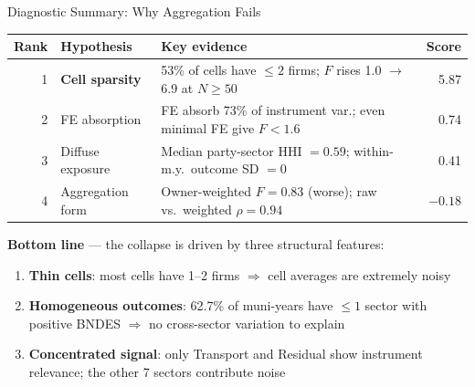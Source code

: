 \documentclass[aspectratio=169,11pt]{beamer}
\begin{document}
\begin{frame}[shrink=5]{Diagnostic Summary: Why Aggregation Fails}

\begin{center}
\small
\begin{tabular}{r l p{6cm} r}
\toprule
\textbf{Rank} & \textbf{Hypothesis} & \textbf{Key evidence} & \textbf{Score} \\
\midrule
1 & \textbf{Cell sparsity} & 53\% of cells have $\leq 2$ firms; $F$ rises 1.0 $\to$ 6.9 at $N \geq 50$ & 5.87 \\[3pt]
2 & FE absorption & FE absorb 73\% of instrument var.; even minimal FE give $F < 1.6$ & 0.74 \\[3pt]
3 & Diffuse exposure & Median party-sector HHI $= 0.59$; within-m.y.\ outcome SD $= 0$ & 0.41 \\[3pt]
4 & Aggregation form & Owner-weighted $F = 0.83$ (worse); raw vs.\ weighted $\rho = 0.94$ & $-0.18$ \\
\bottomrule
\end{tabular}
\end{center}

\medskip

\textbf{Bottom line} --- the collapse is driven by three structural features:
\begin{enumerate}\setlength{\itemsep}{2pt}
    \item \textbf{Thin cells}: most cells have 1--2 firms $\Rightarrow$ cell averages are extremely noisy
    \item \textbf{Homogeneous outcomes}: 62.7\% of muni-years have $\leq 1$ sector with positive BNDES $\Rightarrow$ no cross-sector variation to explain
    \item \textbf{Concentrated signal}: only Transport and Residual show instrument relevance; the other 7 sectors contribute noise
\end{enumerate}

\end{frame}
\end{document}
